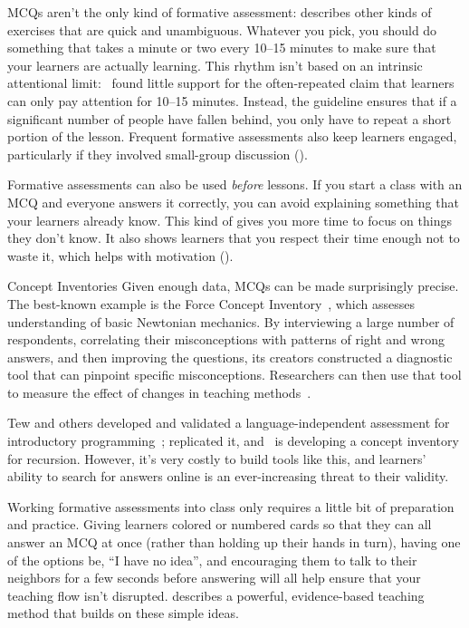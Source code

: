 MCQs aren't the only kind of formative assessment:
 describes other kinds of exercises that are quick and unambiguous.
Whatever you pick,
you should do something that takes a minute or two every 10--15 minutes
to make sure that your learners are actually learning.
This rhythm isn't based on an intrinsic attentional limit:~\cite{Wils2007}
found little support for the often-repeated claim that
learners can only pay attention for 10--15 minutes.
Instead,
the guideline ensures that if a significant number of people have fallen behind,
you only have to repeat a short portion of the lesson.
Frequent formative assessments also keep learners engaged,
particularly if they involved small-group discussion
().

Formative assessments can also be used \emph{before} lessons.
If you start a class with an MCQ and everyone answers it correctly,
you can avoid explaining something that your learners already know.
This kind of 
gives you more time to focus on things they don't know.
It also shows learners that you respect their time enough not to waste it,
which helps with motivation ().

\begin{aside}{Concept Inventories}
  Given enough data,
  MCQs can be made surprisingly precise.
  The best-known example is the Force Concept Inventory~\cite{Hest1992},
  which assesses understanding of basic Newtonian mechanics.
  By interviewing a large number of respondents,
  correlating their misconceptions with patterns of right and wrong answers,
  and then improving the questions,
  its creators constructed a diagnostic tool that can pinpoint specific misconceptions.
  Researchers can then use that tool to measure the effect of changes in teaching methods~\cite{Hake1998}.

  Tew and others developed and validated
  a language-independent assessment for introductory programming~\cite{Tew2011};
  \cite{Park2016} replicated it,
  and~\cite{Hamo2017} is developing a concept inventory for recursion.
  However,
  it's very costly to build tools like this,
  and learners' ability to search for answers online is an ever-increasing threat to their validity.
\end{aside}

Working formative assessments into class only requires a little bit of preparation and practice.
Giving learners colored or numbered cards so that they can all answer an MCQ at once
(rather than holding up their hands in turn),
having one of the options be, ``I have no idea'',
and encouraging them to talk to their neighbors for a few seconds before answering
will all help ensure that your teaching flow isn't disrupted.
 describes a powerful,
evidence-based teaching method that builds on these simple ideas.

